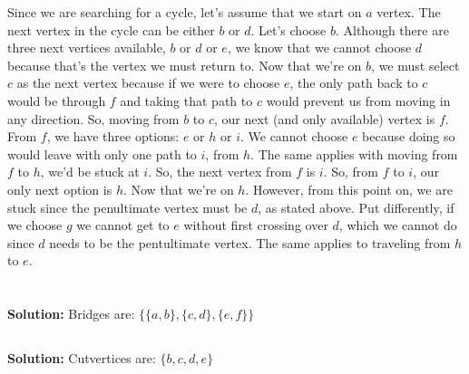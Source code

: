 \documentclass{article}
\begin{document}
Since we are searching for a cycle, let's assume that we start on $a$ vertex. The next vertex in the cycle can be either $b$ or $d$. Let's choose $b$. Although there are three next vertices available, $b$ or $d$ or $e$, we know that we cannot choose $d$ because that's the vertex we must return to. Now that we're on $b$, we must select $c$ as the next vertex because if we were to choose $e$, the only path back to $c$ would be through $f$ and taking that path to $c$ would prevent us from moving in any direction. So, moving from $b$ to $c$, our next (and only available) vertex is $f$. From $f$, we have three options: $e$ or $h$ or $i$. We cannot choose $e$ because doing so would leave with only one path to $i$, from $h$. The same applies with moving from $f$ to $h$, we'd be stuck at $i$. So, the next vertex from $f$ is $i$. So, from $f$ to $i$, our only next option is $h$. Now that we're on $h$. However, from this point on, we are stuck since the penultimate vertex must be $d$, as stated above. Put differently, if we choose $g$ we cannot get to $e$ without first crossing over $d$, which we cannot do since $d$ needs to be the pentultimate vertex. The same applies to traveling from $h$ to $e$.

\section{}

\subsection{}

\textbf{Solution: } Bridges are: $\{\{a,b\}, \{c,d\}, \{e, f\}\}$

\subsection{}

\textbf{Solution: } Cutvertices are: $\{b, c, d, e\}$

\section{}

\subsection{}
\end{document}
